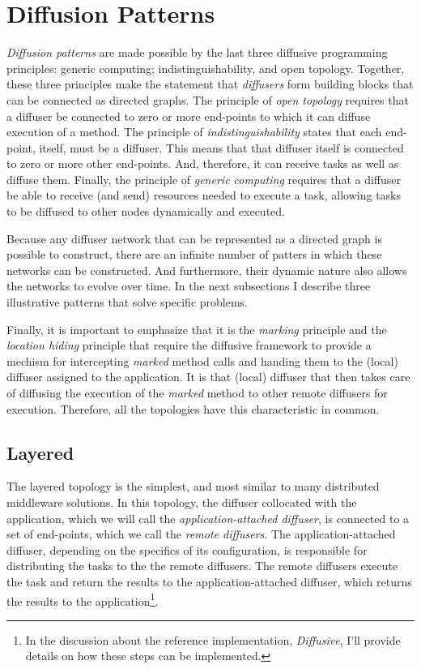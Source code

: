 \documentclass[11pt]{scrartcl}
\begin{document}
%
%
\section{Diffusion Patterns}\label{sec:diffusion_patterns}
\emph{Diffusion patterns} are made possible by the last three diffusive programming principles: generic computing; indistinguishability, and open topology. Together, these three principles make the statement that \emph{diffusers} form building blocks that can be connected as directed graphs. The principle of \emph{open topology} requires that a diffuser be connected to zero or more end-points to which it can diffuse execution of a method. The principle of \emph{indistinguishability} states that each end-point, itself, must be a diffuser. This means that that diffuser itself is connected to zero or more other end-points. And, therefore, it can receive tasks as well as diffuse them. Finally, the principle of \emph{generic computing} requires that a diffuser be able to receive (and send) resources needed to execute a task, allowing tasks to be diffused to other nodes dynamically and executed.

Because any diffuser network that can be represented as a directed graph is possible to construct, there are an infinite number of patters in which these networks can be constructed. And furthermore, their dynamic nature also allows the networks to evolve over time. In the next subsections I describe three illustrative patterns that solve specific problems.

Finally, it is important to emphasize that it is the \emph{marking} principle and the \emph{location hiding} principle that require the diffusive framework to provide a mechism for intercepting \emph{marked} method calls and handing them to the (local) diffuser assigned to the application. It is that (local) diffuser that then takes care of diffusing the execution of the \emph{marked} method to other remote diffusers for execution. Therefore, all the topologies have this characteristic in common.

\subsection{Layered}
The layered topology is the simplest, and most similar to many distributed middleware solutions. In this topology, the diffuser collocated with the application, which we will call the \emph{application-attached diffuser}, is connected to a set of end-points, which we call the \emph{remote diffusers}. The application-attached diffuser, depending on the specifics of its configuration, is responsible for distributing the tasks to the the remote diffusers. The remote diffusers execute the task and return the results to the application-attached diffuser, which returns the results to the application\footnote{In the discussion about the reference implementation, \emph{Diffusive}, I'll provide details on how these steps can be implemented.}. 
\end{document}
